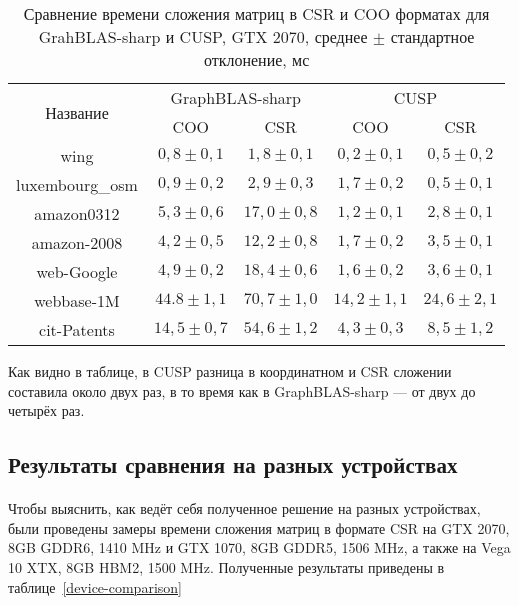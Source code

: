 \documentclass[14pt]{matmex-diploma-custom}
\begin{document}
\begin{table}
\centering
\begin{tabular}{|c||c|c|c|c|} 
\hline
\multirow{2}{*}{Название} & \multicolumn{2}{c|}{GraphBLAS-sharp} & \multicolumn{2}{c|}{CUSP}  \\ 
\cline{2-5}
                          & COO        & CSR                     & COO        & CSR           \\ 
\hline
\hline
wing                      & $0,8 \pm 0,1$  & $1,8 \pm 0,1$          & $0,2 \pm 0,1$  & $0,5 \pm 0,2$     \\ 
\hline
luxembourg\_osm           & $0,9 \pm 0,2$  & $2,9 \pm 0,3$           & $1,7 \pm 0,2$  & $0,5 \pm 0,1$     \\ 
\hline
amazon0312                & $5,3 \pm 0,6$  & $17,0 \pm 0,8$             & $1,2 \pm 0,1$  & $2,8 \pm 0,1$    \\ 
\hline
amazon-2008               & $4,2 \pm 0,5$  & $12,2 \pm 0,8$              & $1,7 \pm 0,2$  & $3,5 \pm 0,1$    \\ 
\hline
web-Google                & $4,9 \pm 0,2$  & $18,4 \pm 0,6$             & $1,6 \pm 0,2$  & $3,6 \pm 0,1$     \\ 
\hline
webbase-1M                & $44.8 \pm 1,1$ & $70,7 \pm 1,0$             & $14,2 \pm 1,1$ & $24,6 \pm 2,1$  \\ 
\hline
cit-Patents               & $14,5 \pm 0,7$  & $54,6 \pm 1,2$            & $4,3 \pm 0,3$  & $8,5 \pm 1,2$   \\
\hline
\end{tabular}
\caption{Сравнение времени сложения матриц в CSR и COO форматах для GrahBLAS-sharp и CUSP, GTX 2070, среднее $\pm$ стандартное отклонение, мс}
\label{formats-comparison}
\end{table}

Как видно в таблице, в CUSP разница в координатном и CSR сложении составила около двух раз, в то время как в GraphBLAS-sharp --- от двух до четырёх раз.

\subsection{Результаты сравнения на разных устройствах}
\paragraph{}Чтобы выяснить, как ведёт себя полученное решение на разных устройствах, были проведены замеры времени сложения матриц в формате CSR на GTX 2070, 8GB GDDR6, 1410 MHz и GTX 1070, 8GB GDDR5, 1506 MHz, а также на Vega 10 XTX, 8GB HBM2, 1500 MHz. Полученные результаты приведены в таблице~\ref{device-comparison}
\end{document}
